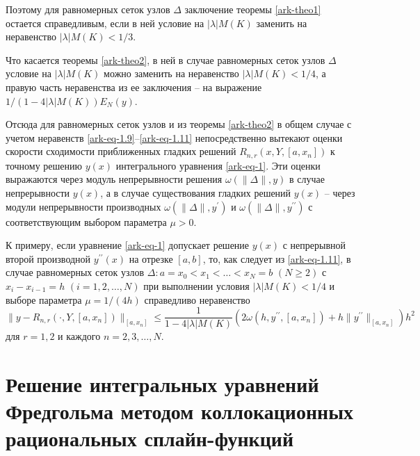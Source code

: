 Поэтому для равномерных сеток узлов $\Delta$ заключение
теоремы \ref{ark-theo1} остается справедливым, если в ней условие
на $|\lambda|M(K)$  заменить на неравенство $|\lambda|M(K)<1/3$.

Что касается теоремы \ref{ark-theo2}, в ней в случае равномерных сеток
узлов $\Delta$ условие на $|\lambda|M(K)$  можно заменить
на неравенство $|\lambda|M(K)<1/4$, а правую часть неравенства из
ее заключения -- на выражение $1/(1-4|\lambda|M(K))E_N(y)$.

Отсюда для равномерных сеток узлов и из теоремы \ref{ark-theo2} в общем случае с учетом
 неравенств \eqref{ark-eq-1.9}--\eqref{ark-eq-1.11}
непосредственно вытекают оценки скорости сходимости приближенных гладких решений
$R_{n,r}(x,Y,[a,x_n])$ к точному решению $y(x)$ интегрального уравнения \eqref{ark-eq-1}.
Эти оценки выражаются через модуль непрерывности решения $\omega(\|\Delta\|,y)$ в случае
непрерывности $y(x)$, а в случае существования гладких решений $y(x)$ --
через модули непрерывности производных
  $\omega(\|\Delta\|,y^\prime)$ и $\omega(\|\Delta\|,y^{\prime\prime})$
с соответствующим выбором параметра $\mu>0$.

К примеру, если уравнение \eqref{ark-eq-1} допускает решение $y(x)$ с непрерывной
второй производной  $y^{\prime\prime}(x)$
на отрезке $[a,b]$, то, как следует из \eqref{ark-eq-1.11}, в случае равномерных сеток узлов
$\Delta: a=x_0<x_1<\dots<x_N=b$ $(N\geqslant 2)$ с $x_i-x_{i-1}=h$ $(i=1,2,\dots,N)$ при
выполнении условия $|\lambda|M(K)<1/4$ и выборе параметра $\mu=1/(4h)$
справедливо неравенство
$$
\|y-R_{n,r}(\cdot,Y,[a,x_n])\|_{[a,x_n]}\leqslant \frac 1{1-4|\lambda|M(K)}
\left(2\omega(h,y^{\prime\prime},[a,x_n])+h\|y^{\prime\prime}\|_{[a,x_n]}\right) h^2
$$
для $r=1,2$ и каждого $n=2,3,\dots,N$.



\chapter{Решение интегральных уравнений Фредгольма методом
коллокационных рациональных сплайн-функций}

%

